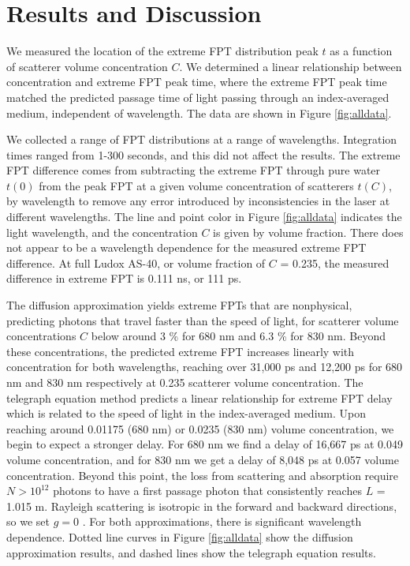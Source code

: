 \documentclass[9pt,twocolumn,twoside]{opticajnl}
\begin{document}
\section{Results and Discussion}

We measured the location of the extreme FPT distribution peak $t$ as a function of scatterer volume concentration $C$. We determined a linear relationship between concentration and extreme FPT peak time, where the extreme FPT peak time matched the predicted passage time of light passing through an index-averaged medium, independent of wavelength. The data are shown in Figure \ref{fig:alldata}.

We collected a range of FPT distributions at a range of wavelengths. Integration times ranged from 1-300 seconds, and this did not affect the results. The extreme FPT difference comes from subtracting the extreme FPT through pure water $t\left(0\right)$ from the peak FPT at a given volume concentration of scatterers $t\left(C\right)$, by wavelength to remove any error introduced by inconsistencies in the laser at different wavelengths. The line and point color in Figure \ref{fig:alldata} indicates the light wavelength, and the concentration $C$ is given by volume fraction. There does not appear to be a wavelength dependence for the measured extreme FPT difference. At full Ludox AS-40, or volume fraction of $C$ = 0.235, the measured difference in extreme FPT is 0.111 ns, or 111 ps. 

The diffusion approximation yields extreme FPTs that are nonphysical, predicting photons that travel faster than the speed of light, for scatterer volume concentrations $C$ below around 3 \% for 680 nm and 6.3 \% for 830 nm. Beyond these concentrations, the predicted extreme FPT increases linearly with concentration for both wavelengths, reaching over 31,000 ps and 12,200 ps for 680 nm and 830 nm respectively at 0.235 scatterer volume concentration. 
The telegraph equation method predicts a linear relationship for extreme FPT delay which is related to the speed of light in the index-averaged medium. Upon reaching around 0.01175 (680 nm) or 0.0235 (830 nm) volume concentration, we begin to expect a stronger delay. For 680 nm we find a delay of 16,667 ps at 0.049 volume concentration, and for 830 nm we get a delay of 8,048 ps at 0.057 volume concentration. Beyond this point, the loss from scattering and absorption require $N > 10^{12}$ photons to have a first passage photon that consistently reaches $L$ = 1.015 m. Rayleigh scattering is isotropic in the forward and backward directions, so we set $g=0$ \cite{bohren_absorption_1983}. For both approximations, there is significant wavelength dependence. Dotted line curves in Figure \ref{fig:alldata} show the diffusion approximation results, and dashed lines show the telegraph equation results.
\end{document}
